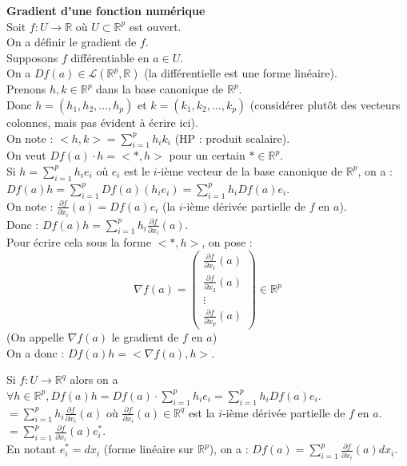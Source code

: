 \documentclass{article}
\begin{document}


\textbf{Gradient d'une fonction numérique}\\
Soit $f \colon U \to \mathbb{R}$ où $U \subset \mathbb{R}^p$ est ouvert.\\
On a définir le gradient de $f$.\\
Supposons $f$ différentiable en $a \in U$.\\
On a $Df(a) \in \mathcal{L}(\mathbb{R}^p, \mathbb{R})$ (la différentielle est une forme linéaire).\\
Prenons $h,k \in \mathbb{R}^p$ dans la base canonique de $\mathbb{R}^p$.\\
Donc $h = (h_1, h_2, \ldots, h_p)$ et $k = (k_1, k_2, \ldots, k_p)$ (considérer plutôt des vecteurs colonnes, mais pas évident à écrire ici).\\
On note : $< h, k > = \sum_{i=1}^p h_i k_i$ (HP : produit scalaire).\\
On veut $Df(a) \cdot h = < *, h>$ pour un certain $* \in \mathbb{R}^p$.\\
Si $h = \sum_{i=1}^p h_i e_i$ où $e_i$ est le $i$-ième vecteur de la base canonique de $\mathbb{R}^p$, on a :\\
$Df(a)h = \sum_{i=1}^p Df(a) (h_i e_i) = \sum_{i=1}^p h_i Df(a)e_i$.\\
On note : $\frac{\partial f}{\partial x_i}(a) = Df(a)e_i$ (la $i$-ième dérivée partielle de $f$ en $a$).\\
Donc : $Df(a)h = \sum_{i=1}^p h_i \frac{\partial f}{\partial x_i}(a)$.\\
Pour écrire cela sous la forme $< *, h>$, on pose :
\[
    \nabla f(a) = \begin{pmatrix}
        \frac{\partial f}{\partial x_1}(a) \\
        \frac{\partial f}{\partial x_2}(a) \\
        \vdots \\
        \frac{\partial f}{\partial x_p}(a)
    \end{pmatrix} \in \mathbb{R}^p
\]
(On appelle $\nabla f(a)$ le gradient de $f$ en $a$)\\
On a donc : $Df(a)h = < \nabla f(a), h >$.


Si $f : U \to \mathbb{R}^q$ alors on a $\forall h \in \mathbb{R}^p, Df(a)h  = Df(a) \cdot \sum_{i=1}^p h_i e_i = \sum_{i=1}^p h_i Df(a)e_i$.\\
$= \sum_{i=1}^p h_i \frac{\partial f}{\partial x_i}(a)$ où $\frac{\partial f}{\partial x_i}(a) \in \mathbb{R}^q$ est la $i$-ième dérivée partielle de $f$ en $a$.\\
$= \sum_{i=1}^p \frac{\partial f}{\partial x_i}(a) e_i^*$.\\
En notant $e_i^* = dx_i$ (forme linéaire sur $\mathbb{R}^p$), on a : $Df(a) = \sum_{i=1}^p \frac{\partial f}{\partial x_i}(a) dx_i$.\\
\end{document}
